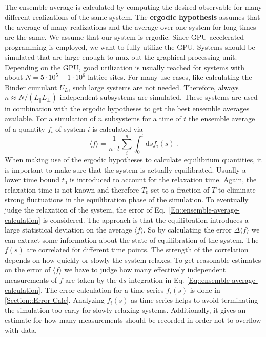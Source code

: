 	The ensemble average is calculated by computing the desired observable for many different realizations of the same system. The \textbf{ergodic hypothesis} assumes that the average of many realizations and the average over one system for long times are the same. We assume that our system is ergodic. Since GPU accelerated programming is employed, we want to fully utilize the GPU. Systems should be simulated that are large enough to max out the graphical processing unit. Depending on the GPU, good utilization is usually reached for systems with about $N=  5 \cdot 10^5 - 1 \cdot 10^6$ lattice sites. For many use cases, like calculating the Binder cumulant $U_L$, such large systems are not needed. Therefore, always $n \approx	N /	(L_\parallel L_\perp)$ independent subsystems are simulated. These systems are used in combination with the ergodic hypotheses to get the best ensemble averages available. For a simulation of $n$ subsystems for a time of $t$ the ensemble average of a quantity $f_i$ of system $i$ is calculated via
	\begin{equation} \label{Eq::ensemble-average-calculation}
		\langle f \rangle = \frac{1}{n \cdot t} \sum_i^n \int_0^{t} \text{d}s f_i(s)~.
	\end{equation}
	 When making use of the ergodic hypotheses to calculate equilibrium quantities, it is important to make sure that the system is actually equilibrated. Usually a lower time bound $t_0$ is introduced to account for the relaxation time. Again, the relaxation time is not known and therefore $T_0$ set to a fraction of $T$ to eliminate strong fluctuations in the equilibration phase of the simulation. To eventually judge the relaxation of the system, the error of Eq.~\eqref{Eq::ensemble-average-calculation} is considered. The approach is that the equilibration introduces a large statistical deviation on the average $\langle f \rangle$. So by calculating the error $\Delta \langle f \rangle $ we can extract some information about the state of equilibration of the system. The $f(s)$ are correlated for different time points. The strength of the correlation depends on how quickly or slowly the system relaxes. To get reasonable estimates on the error of $\langle f \rangle$ we have to judge how many effectively independent measurements of $f$ are taken by the $\text{d}s$ integration in Eq. \eqref{Eq::ensemble-average-calculation}. The error calculation for a time series $f_i(s)$ is done in  \autoref{Section::Error-Calc}. Analyzing $f_i(s)$ as time series helps to avoid terminating the simulation too early for slowly relaxing systems. Additionally, it gives an estimate for how many measurements should be recorded in order not to overflow with data. \\
	 
